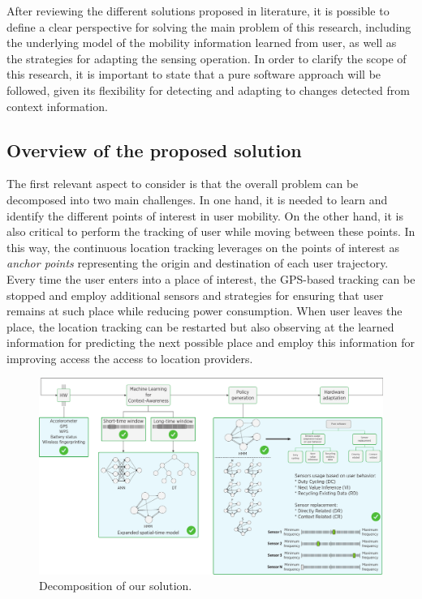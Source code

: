 \documentclass[ENG,PhD]{cinvestav}
\begin{document}
After reviewing the different solutions proposed in literature, it is possible to define a clear perspective for solving the main problem of this research, including the underlying model of the mobility information learned from user, as well as the strategies for adapting the sensing operation.
In order to clarify the scope of this research, it is important to state that a pure software approach will be followed, given its flexibility for detecting and adapting to changes detected from context information.

\subsection{Overview of the proposed solution}

The first relevant aspect to consider is that the overall problem can be decomposed into two main challenges.
In one hand, it is needed to learn and identify the different points of interest in user mobility.
On the other hand, it is also critical to perform the tracking of user while moving between these points.
In this way, the continuous location tracking leverages on the points of interest as \emph{anchor points} representing the origin and destination of each user trajectory.
Every time the user enters into a place of interest, the GPS-based tracking can be stopped and employ additional sensors and strategies for ensuring that user remains at such place while reducing power consumption.
When user leaves the place, the location tracking can be restarted but also observing at the learned information for predicting the next possible place and employ this information for improving access the access to location providers.

\begin{figure}[t]
  \centering
  \includegraphics[width=\textwidth]{dual-taxonomy-ours}
  \caption{Decomposition of our solution.}
  \label{fig:decomposition-our-solution}
\end{figure}
\end{document}
